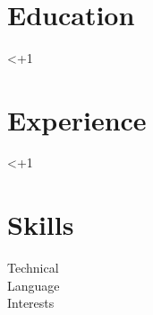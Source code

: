 \documentclass[11pt]{article}
\newcounter{li}
\begin{document}

\begin{center}
  {
    \fontsize{36}{12}
    \selectfont
    \color{accent}
    \personname
  } \\ \medskip

  {\color{gray}{\faHome}} \personaddress \quad
  \href{tel:\personphonehref}{
    {\color{gray}{\faPhone}} \personphone
  } \quad
  \href{mailto:\personemail}{
    {\color{gray}{\faEnvelope}} \personemail
  } \quad
  \href{\personlinkedinurl}{
    {\color{gray}{\faLinkedin}} \personlinkedin
  } \quad
\end{center}




\section{Education}

\setcounter{li}{1}

\loop
  \ifnum\value{li}<\numexpr\numedu+1\relax

    \eduEntry{\theli}


\repeat



\section{Experience}

\setcounter{li}{1}

\loop
  \ifnum\value{li}<\numexpr\numexp+1\relax

    \expEntry{\theli}


\repeat



\section{Skills}

\begin{description}
  \item[Technical] \skillTechnical
  \item[Language] \skillLanguage
  \item[Interests] \skillInterests
\end{description}
\end{document}
